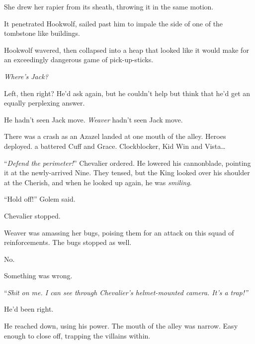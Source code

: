 She drew her rapier from its sheath, throwing it in the same motion.



It penetrated Hookwolf, sailed past him to impale the side of one of the tombstone like buildings.



Hookwolf wavered, then collapsed into a heap that looked like it would make for an exceedingly dangerous game of pick-up-sticks.



\emph{Where's Jack?}



Left, then right?  He'd ask again, but he couldn't help but think that he'd get an equally perplexing answer.



He hadn't seen Jack move.  \emph{Weaver} hadn't seen Jack move.



There was a crash as an Azazel landed at one mouth of the alley.  Heroes deployed.  a battered Cuff and Grace.  Clockblocker, Kid Win and Vista\ldots



``\emph{Defend the perimeter!}'' Chevalier ordered.  He lowered his cannonblade, pointing it at the newly-arrived Nine.  They tensed, but the King looked over his shoulder at the Cherish, and when he looked up again, he was \emph{smiling}.



``Hold off!'' Golem said.



Chevalier stopped.



Weaver was amassing her bugs, poising them for an attack on this squad of reinforcements.  The bugs stopped as well.



No.



Something was wrong.



``\emph{Shit on me.  I can see through Chevalier's helmet-mounted camera.  It's a trap!''}



He'd been right.



He reached down, using his power.  The mouth of the alley was narrow.  Easy enough to close off, trapping the villains within.



